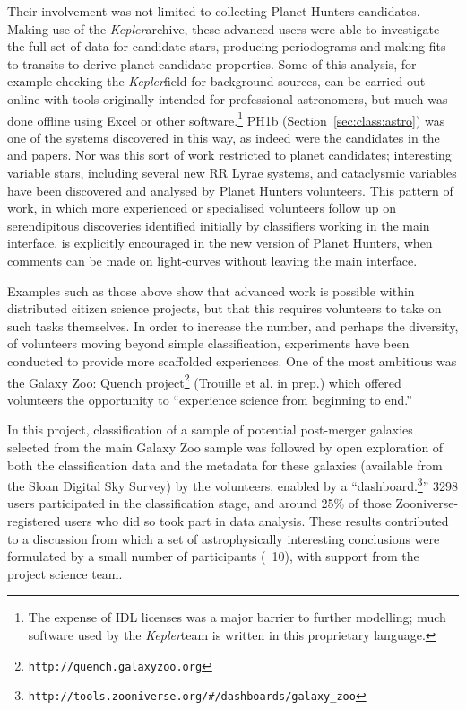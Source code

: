 \documentclass{ar2e}
\def\Sref#1{Section~\ref{#1}\xspace}
\def\CaseStudy#1{\noindent{\it\bf #1 \,\,\,\,}}
\def\url#1{\texttt{#1}}
\def\Kepler{{\it Kepler}}
\begin{document}
Their involvement was not limited to collecting Planet Hunters candidates.
Making use of the \Kepler archive, these advanced users were able to investigate
the full set of data for candidate stars, producing periodograms and making
fits  to transits to derive planet candidate properties. Some of this analysis,
for example checking the \Kepler field for  background sources, can be carried
out online with tools originally intended for professional astronomers, but much
was done offline using Excel or other software.\footnote{The expense of IDL
licenses was a major barrier to further modelling; much  software used by the
\Kepler team is written in this proprietary language.} 
PH1b (\Sref{sec:class:astro}) was one of the systems discovered in this way, as indeed 
were the candidates in the \citet{Wang2013} and \citet{Schmitt2014} papers.
Nor was this sort of work
restricted to planet candidates; interesting variable stars, including several
new RR Lyrae systems, and cataclysmic variables \citep[e.g.\ ][]{KatoOsaki} 
have been discovered and analysed by Planet Hunters volunteers. This pattern of work, in
which more experienced or specialised volunteers follow up on serendipitous discoveries
identified initially by classifiers working in the main interface, is explicitly encouraged in the
new version of Planet Hunters, when comments can be made on light-curves without leaving the main
interface. 




\CaseStudy{Galaxy Zoo: Quench.} 
Examples such as those above show that advanced work is possible within
distributed citizen science projects, but that this requires volunteers to take
on such tasks themselves. In order to increase the number, and perhaps the
diversity, of volunteers moving beyond simple classification, experiments have
been conducted to provide more scaffolded experiences. One of the most ambitious
was the Galaxy Zoo: Quench project\footnote{\url{http://quench.galaxyzoo.org}}
(Trouille et al. in prep.) which offered volunteers the opportunity to
``experience science from beginning to end.''

In this project, classification of a sample of potential post-merger galaxies
selected from the main Galaxy Zoo sample was followed by open exploration of
both the classification data and the metadata for these galaxies (available from
the Sloan Digital Sky Survey) by the volunteers, enabled by a
``dashboard.\footnote{\url{http://tools.zooniverse.org/\#/dashboards/galaxy\_zoo}}''
3298 users participated in the classification stage, and  around 25\% of
those Zooniverse-registered users who did so took part in data analysis. These results
contributed to a discussion from which a set of astrophysically
interesting conclusions were formulated by a small number of participants (~10),
with support from the project science team.
\end{document}
